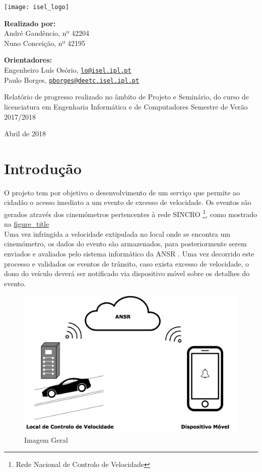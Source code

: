 \documentclass{article}
\begin{document}
	
\texttt{[image: isel\_logo]}

\textbf{Realizado por:}\\
André Gaudêncio, nº 42204\\
Nuno Conceição, nº 42195

\textbf{Orientadores:}\\
Engenheiro Luís Osório,
\href{mailto:lo@isel.ipl.pt}{\nolinkurl{lo@isel.ipl.pt}}\\
Paulo Borges,
\href{mailto:pborges@deetc.isel.ipl.pt}{\nolinkurl{pborges@deetc.isel.ipl.pt}}

Relatório de progresso realizado no âmbito de Projeto e Seminário, do
curso de licenciatura em Engenharia Informática e de Computadores
Semestre de Verão 2017/2018

Abril de 2018

\hypertarget{_introdu_o}{%
\section{Introdução}\label{_introdu_o}}

O projeto tem por objetivo o desenvolvimento de um serviço que permite
ao cidadão o acesso imediato a um evento de excesso de velocidade. Os
eventos são gerados através dos cinemómetros pertencentes à rede SINCRO
\footnote{Rede Nacional de Controlo de Velocidade}, como mostrado na
\protect\hyperlink{big_picture}{figure\_title}\\
Uma vez infringida a velocidade extipulada no local onde se encontra um
cinemómetro, os dados do evento são armazenados, para posteriormente
serem enviados e avaliados pelo sistema informático da ANSR . Uma vez
decorrido este processo e validados os eventos de trânsito, caso exista
excesso de velocidade, o dono do veículo deverá ser notificado via
dispositivo móvel sobre os detalhes do evento.

\begin{figure}
\centering
\includegraphics[scale=0.3]{./adoc_images/general_picture.png}
\caption{Imagem Geral}
\end{figure}
\end{document}
